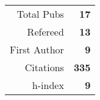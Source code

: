 \begin{table}\begin{tabular}{rr}Total Pubs & \textbf{17}\\Refereed & \textbf{13}\\First Author & \textbf{9}\\Citations & \quad \textbf{335}\\h-index & \textbf{9}\end{tabular}\end{table}